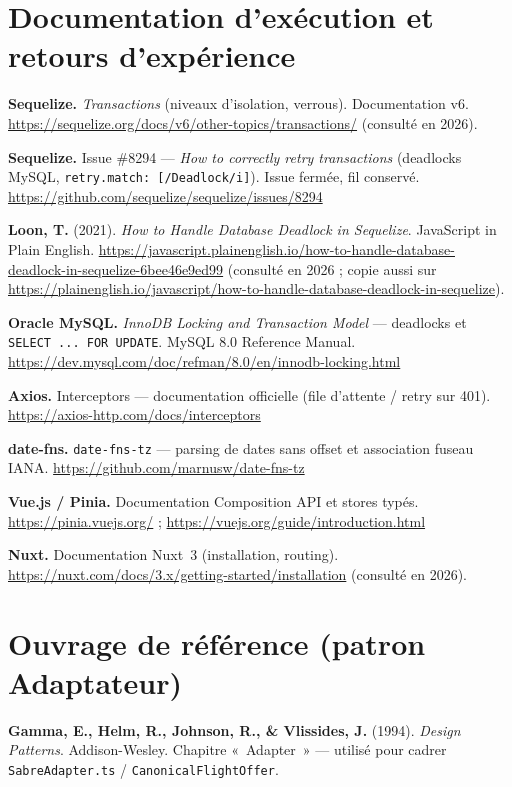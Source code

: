 \section*{Documentation d'exécution et retours d'expérience}
\begin{enumerate}[label={[T-\arabic*]},leftmargin=*,itemsep=5pt]
    \item \textbf{Sequelize.} \textit{Transactions} (niveaux d'isolation, verrous). Documentation v6. \url{https://sequelize.org/docs/v6/other-topics/transactions/} (consulté en 2026).
    \item \textbf{Sequelize.} Issue \#8294 --- \textit{How to correctly retry transactions} (deadlocks MySQL, \texttt{retry.match: [/Deadlock/i]}). Issue fermée, fil conservé. \url{https://github.com/sequelize/sequelize/issues/8294}
    \item \textbf{Loon, T.} (2021). \textit{How to Handle Database Deadlock in Sequelize}. JavaScript in Plain English. \url{https://javascript.plainenglish.io/how-to-handle-database-deadlock-in-sequelize-6bee46e9ed99} (consulté en 2026 ; copie aussi sur \url{https://plainenglish.io/javascript/how-to-handle-database-deadlock-in-sequelize}).
    \item \textbf{Oracle MySQL.} \textit{InnoDB Locking and Transaction Model} --- deadlocks et \texttt{SELECT ... FOR UPDATE}. MySQL 8.0 Reference Manual. \url{https://dev.mysql.com/doc/refman/8.0/en/innodb-locking.html}
    \item \textbf{Axios.} Interceptors --- documentation officielle (file d'attente / retry sur 401). \url{https://axios-http.com/docs/interceptors}
    \item \textbf{date-fns.} \texttt{date-fns-tz} --- parsing de dates sans offset et association fuseau IANA. \url{https://github.com/marnusw/date-fns-tz}
    \item \textbf{Vue.js / Pinia.} Documentation Composition API et stores typés. \url{https://pinia.vuejs.org/} ; \url{https://vuejs.org/guide/introduction.html}
    \item \textbf{Nuxt.} Documentation Nuxt~3 (installation, routing). \url{https://nuxt.com/docs/3.x/getting-started/installation} (consulté en 2026).
\end{enumerate}

\section*{Ouvrage de référence (patron Adaptateur)}
\begin{enumerate}[label={[B-\arabic*]},leftmargin=*,itemsep=5pt]
    \item \textbf{Gamma, E., Helm, R., Johnson, R., \& Vlissides, J.} (1994). \textit{Design Patterns}. Addison-Wesley. Chapitre «~Adapter~» --- utilisé pour cadrer \texttt{SabreAdapter.ts} / \texttt{CanonicalFlightOffer}.
\end{enumerate}
